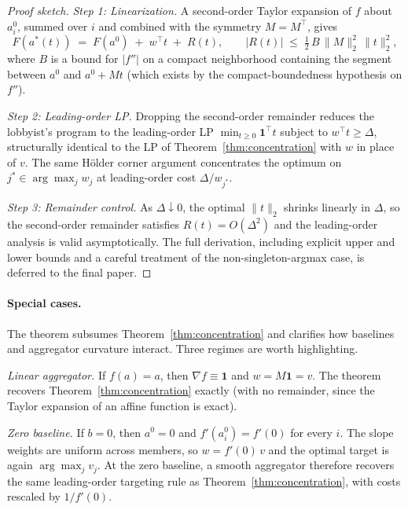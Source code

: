 \documentclass[11pt,letterpaper]{article}
\theoremstyle{plain}
\theoremstyle{definition}
\theoremstyle{remark}
\begin{document}
\begin{proof}[Proof sketch]
\emph{Step 1: Linearization.} A second-order Taylor expansion of $f$ about $a^0_i$, summed over $i$ and combined with the symmetry $M = M^\top$, gives
\[
F(a^*(t)) \;=\; F(a^0) \;+\; w^\top t \;+\; R(t), \qquad |R(t)| \;\leq\; \tfrac{1}{2}\, B\, \|M\|_2^2\, \|t\|_2^2,
\]
where $B$ is a bound for $|f''|$ on a compact neighborhood containing the segment between $a^0$ and $a^0 + Mt$ (which exists by the compact-boundedness hypothesis on $f''$).

\smallskip\noindent\emph{Step 2: Leading-order LP.} Dropping the second-order remainder reduces the lobbyist's program to the leading-order LP $\min_{t \geq 0} \mathbf{1}^\top t$ subject to $w^\top t \geq \Delta$, structurally identical to the LP of Theorem~\ref{thm:concentration} with $w$ in place of $v$. The same H\"older corner argument concentrates the optimum on $j^* \in \arg\max_j w_j$ at leading-order cost $\Delta / w_{j^*}$.

\smallskip\noindent\emph{Step 3: Remainder control.} As $\Delta \downarrow 0$, the optimal $\|t\|_2$ shrinks linearly in $\Delta$, so the second-order remainder satisfies $R(t) = O(\Delta^2)$ and the leading-order analysis is valid asymptotically. The full derivation, including explicit upper and lower bounds and a careful treatment of the non-singleton-argmax case, is deferred to the final paper.
\end{proof}

\paragraph{Special cases.} The theorem subsumes Theorem~\ref{thm:concentration} and clarifies how baselines and aggregator curvature interact. Three regimes are worth highlighting.

\emph{Linear aggregator.} If $f(a) = a$, then $\nabla f \equiv \mathbf{1}$ and $w = M\mathbf{1} = v$. The theorem recovers Theorem~\ref{thm:concentration} exactly (with no remainder, since the Taylor expansion of an affine function is exact).

\emph{Zero baseline.} If $b = 0$, then $a^0 = 0$ and $f'(a^0_i) = f'(0)$ for every $i$. The slope weights are uniform across members, so $w = f'(0)\, v$ and the optimal target is again $\arg\max_j v_j$. At the zero baseline, a smooth aggregator therefore recovers the same leading-order targeting rule as Theorem~\ref{thm:concentration}, with costs rescaled by $1/f'(0)$.
\end{document}
